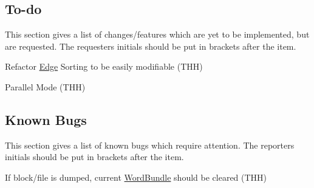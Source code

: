 \subsection*{To-\/do \label{_ToDo}%
}

This section gives a list of changes/features which are yet to be implemented, but are requested. The requester\textquotesingle{}s initials should be put in brackets after the item.


\begin{DoxyItemize}
\item Refactor \hyperlink{class_edge}{Edge} Sorting to be easily modifiable (T\+HH)
\item Parallel Mode (T\+HH)
\end{DoxyItemize}

\subsection*{Known Bugs \label{_KnownBugs}%
}

This section gives a list of known bugs which require attention. The reporter\textquotesingle{}s initials should be put in brackets after the item.


\begin{DoxyItemize}
\item If block/file is dumped, current \hyperlink{class_word_bundle}{Word\+Bundle} should be cleared (T\+HH) 
\end{DoxyItemize}